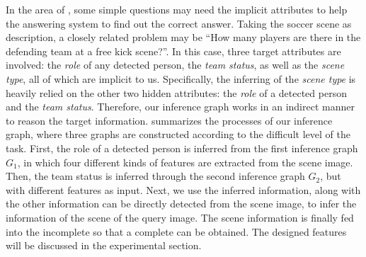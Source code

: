 In the area of \vqa, some simple questions may need the implicit attributes to help the answering system to find out the correct answer. 
Taking the soccer scene as description,
a closely related problem may be ``How many players are there in the defending team at a free kick scene?''. 
In this case, three target attributes are involved: the \emph{role} of any detected person, the \emph{team status}, as well as the \emph{scene type}, all of which are implicit to us. 
Specifically, the inferring of the \emph{scene type} is heavily relied on the other two hidden attributes: the \emph{role} of a detected person and the \emph{team status}. 
Therefore, our inference graph works in an indirect manner to reason the target information.
 summarizes the processes of our inference graph, where three graphs are constructed according to the difficult level of the task. First, the role of a detected person is inferred from the first inference graph $G_1$, in which four different kinds of features are extracted from the scene image. Then, the team status is inferred through the second inference graph $G_2$, but with different features as input. Next, we use the inferred information, along with the other information can be directly detected from the scene image, to infer the information of the scene of the query image.
The scene information is finally fed into the incomplete  so that a complete  can be obtained. 
The designed features will be discussed in the experimental section.  

